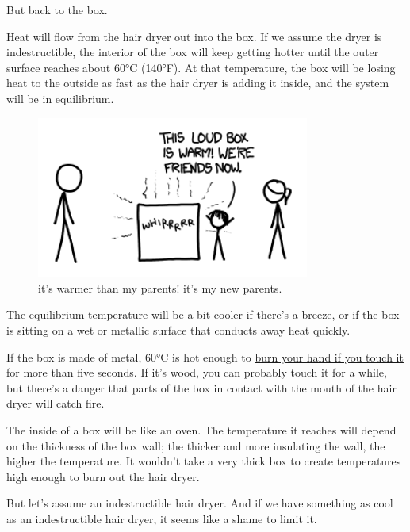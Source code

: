 {But back to the box.}

{Heat will flow from the hair dryer out into the box. If we assume the dryer is indestructible, the interior of the box will keep getting hotter until the outer surface reaches about 60°C (140°F). At that temperature, the box will be losing heat to the outside as fast as the hair dryer is adding it inside, and the system will be in equilibrium.}

\begin{figure}[!htbp]
\centering
\includegraphics[scale=0.5, max width=0.8\textwidth]{imgs/a/35/hair_dryer_equilibrium.png}
\caption{it's warmer than my parents! it's my new parents.}
\end{figure}

{The equilibrium temperature will be a bit cooler if there’s a breeze, or if the box is sitting on a wet or metallic surface that conducts away heat quickly.}

{If the box is made of metal, 60°C is hot enough to \href{http://www.mascoat.com/assets/files/Insulative\_Coating\_Evaluation\_NACE.pdf}{burn your hand if you touch it} for more than five seconds. If it’s wood, you can probably touch it for a while, but there’s a danger that parts of the box in contact with the mouth of the hair dryer will catch fire.}

{The inside of a box will be like an oven. The temperature it reaches will depend on the thickness of the box wall; the thicker and more insulating the wall, the higher the temperature. It wouldn’t take a very thick box to create temperatures high enough to burn out the hair dryer.}

{But let’s assume an indestructible hair dryer. And if we have something as cool as an indestructible hair dryer, it seems like a shame to limit it.}

